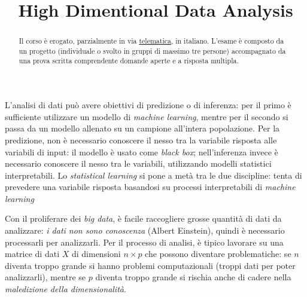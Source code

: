 \documentclass[12pt, a4page]{article}
\title{\textbf{High Dimentional Data Analysis}}
\date{}
\begin{document}
\maketitle
\begin{abstract}
  Il corso è erogato, parzialmente in via \href{https://unimib.webex.com/webappng/sites/unimib/dashboard/attendee/gianna.monti?siteurl=unimib}{telematica}, in italiano. L'esame è composto da un progetto (individuale o svolto in gruppi di massimo tre persone) accompagnato da una prova scritta comprendente domande aperte e a risposta multipla.
\end{abstract}
\tableofcontents

\newpage
L'analisi di dati può avere obiettivi di predizione o di inferenza: per il primo è sufficiente utilizzare un modello di \textit{machine learning}, mentre per il secondo si passa da un modello allenato su un campione all'intera popolazione.
Per la predizione, non è necessario conoscere il nesso tra la variabile risposta alle variabili di input: il modello è usato come \textit{black box}; nell'inferenza invece è necessario conoscere il nesso tra le variabili, utilizzando modelli statistici interpretabili.
Lo \textit{statistical learning} si pone a metà tra le due discipline: tenta di prevedere una variabile risposta basandosi su processi interpretabili di \textit{machine learning}

Con il proliferare dei \textit{big data}, è facile raccogliere grosse quantità di dati da analizzare: \textit{i dati non sono conoscenza} (Albert Einstein), quindi è necessario processarli per analizzarli.
Per il processo di analisi, è tipico lavorare su una matrice di dati $X$ di dimensioni $n \times p$ che possono diventare problematiche: se $n$ diventa troppo grande si hanno problemi computazionali (troppi dati per poter analizzarli), mentre se $p$ diventa troppo grande si rischia anche di cadere nella \textit{maledizione della dimensionalità}.

\newpage
\end{document}
